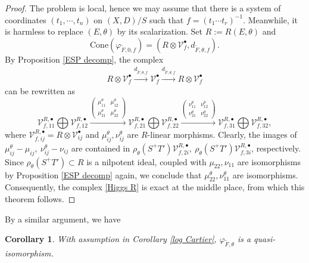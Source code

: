 \documentclass[12pt, a4paper]{article}
\newtheorem{corollary}{Corollary}[section]
\begin{document}
\begin{proof}
 The problem is local, hence we may assume that there is a system of coordinates $(t_1,\cdots,t_n)$ on $(X,D)/S$ such that $f=(t_1\cdots t_r)^{-1}$. Meanwhile, it is harmless to replace $(E,\theta)$ by its scalarization. Set $R:=R(E,\theta)$ and 
$$\mathrm{Cone}(\varphi_{\tilde F,0,f})=(R\otimes\mathcal V_f^\bullet,d_{\tilde F,\theta,f}).$$
By Proposition \ref{ESP decomp}, the complex
\begin{eqnarray}\label{Higgs R}
R\otimes\mathcal V_f^\bullet\xrightarrow{d_{\tilde F,\theta,f}}\mathcal V_f^\bullet\xrightarrow{d_{\tilde F,\theta,f}}R\otimes\mathcal V_f^\bullet
\end{eqnarray}
can be rewritten as
$$
\mathcal V^{R,\bullet}_{f,11}\bigoplus \mathcal V^{R,\bullet}_{f,12}\xrightarrow{ \left(\begin{matrix}\mu^\theta_{11}&\mu^\theta_{12}\\
\mu^\theta_{21}&\mu^\theta_{22}\end{matrix}\right)}\mathcal V^{R,\bullet}_{f,21}\bigoplus \mathcal V^{R,\bullet}_{f,22}\xrightarrow{ \left(\begin{matrix}\nu^\theta_{11}&\nu^\theta_{12}\\
\nu^\theta_{21}&\nu^\theta_{22}\end{matrix}\right)}\mathcal V^{R,\bullet}_{f,31}\bigoplus \mathcal V^{R,\bullet}_{f,32},
$$
where $\mathcal V^{R,\bullet}_{f,ij}=R\otimes\mathcal V^\bullet_{ij}$ and $\mu^\theta_{ij},\nu^\theta_{ij}$ are $R$-linear morphisms. Clearly, the images of 
$\mu^\theta_{ij}-\mu_{ij},~\nu^\theta_{ij}-\nu_{ij}$ are contained in $\rho_\theta(S^+T')\mathcal V^{R,\bullet}_{f,2i},~\rho_\theta(S^+T')\mathcal V^{R,\bullet}_{f,3i}$, respectively. Since $\rho_\theta(S^+T')\subset R$ is a nilpotent ideal, coupled with $\mu_{22},\nu_{11}$ are isomorphisms by Proposition \ref{ESP decomp} again, we conclude that $\mu^\theta_{22},\nu_{11}^\theta$ are isomorphisms. Consequently, the complex \eqref{Higgs R} is exact at the middle place, from which this theorem follows.
 \end{proof}
By a similar argument, we have
\begin{corollary}
With assumption in Corollary \ref{log Cartier}, $\varphi_{\tilde F,\theta}$ is a quasi-isomorphism.
\end{corollary}
\end{document}
